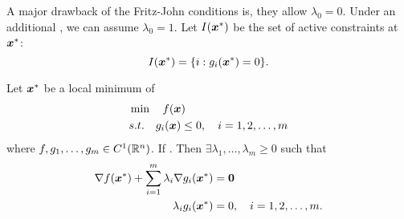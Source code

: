 \documentclass[10pt,a4paper]{book}
\begin{document}
A major drawback of the Fritz-John conditions is, they allow $\lambda_0=0$. Under an additional , we can assume $\lambda_0=1$. Let $I({\boldsymbol x}^*)$ be the set of active constraints at ${\boldsymbol x}^*$: 
\begin{equation*}
	I({\boldsymbol x}^*)=\{i:g_i({\boldsymbol x}^*)=0\}.
\end{equation*}
\begin{thmbox}
	\begin{theorem}\label{thm:KKT-ineq_constrained}
		Let ${\boldsymbol x}^*$ be a local minimum of 
		\begin{align*}
		&\min\quad f({\boldsymbol x})\\
		&s.t.\quad g_i({\boldsymbol x})\leq0,\quad i=1,2,\ldots,m
		\end{align*}
		where $f,g_1,\ldots,g_m\in C^1(\mathbb R^n)$. If . Then $\exists \lambda_1,\ldots,\lambda_m\geq 0$ such that  
		\begin{align*}
			\nabla f({\boldsymbol x}^*)+\sum_{i=1}^m\lambda_i\nabla g_i({\boldsymbol x}^*)& ={\boldsymbol 0} \\
			\lambda_ig_i({\boldsymbol x}^*)& =0, \quad i=1,2,\ldots,m.
		\end{align*} 
	\end{theorem}	
\end{thmbox}
\end{document}
